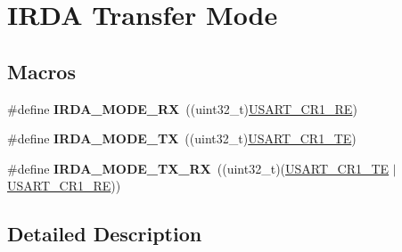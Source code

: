 \hypertarget{group___i_r_d_a___mode}{}\section{I\+R\+DA Transfer Mode}
\label{group___i_r_d_a___mode}
\subsection*{Macros}
\begin{DoxyCompactItemize}
\item 
\#define {\bfseries I\+R\+D\+A\+\_\+\+M\+O\+D\+E\+\_\+\+RX}~((uint32\+\_\+t)\hyperlink{group___peripheral___registers___bits___definition_gada0d5d407a22264de847bc1b40a17aeb}{U\+S\+A\+R\+T\+\_\+\+C\+R1\+\_\+\+RE})\hypertarget{group___i_r_d_a___mode_ga510410f9b2126127f5f1a7e86b49427a}{}\label{group___i_r_d_a___mode_ga510410f9b2126127f5f1a7e86b49427a}

\item 
\#define {\bfseries I\+R\+D\+A\+\_\+\+M\+O\+D\+E\+\_\+\+TX}~((uint32\+\_\+t)\hyperlink{group___peripheral___registers___bits___definition_gade7f090b04fd78b755b43357ecaa9622}{U\+S\+A\+R\+T\+\_\+\+C\+R1\+\_\+\+TE})\hypertarget{group___i_r_d_a___mode_ga9f26f67fa86746fab0039fe60a1ccefd}{}\label{group___i_r_d_a___mode_ga9f26f67fa86746fab0039fe60a1ccefd}

\item 
\#define {\bfseries I\+R\+D\+A\+\_\+\+M\+O\+D\+E\+\_\+\+T\+X\+\_\+\+RX}~((uint32\+\_\+t)(\hyperlink{group___peripheral___registers___bits___definition_gade7f090b04fd78b755b43357ecaa9622}{U\+S\+A\+R\+T\+\_\+\+C\+R1\+\_\+\+TE} $\vert$\hyperlink{group___peripheral___registers___bits___definition_gada0d5d407a22264de847bc1b40a17aeb}{U\+S\+A\+R\+T\+\_\+\+C\+R1\+\_\+\+RE}))\hypertarget{group___i_r_d_a___mode_gada775794a25b76b7ecafc9bea3fc1f8a}{}\label{group___i_r_d_a___mode_gada775794a25b76b7ecafc9bea3fc1f8a}

\end{DoxyCompactItemize}


\subsection{Detailed Description}
